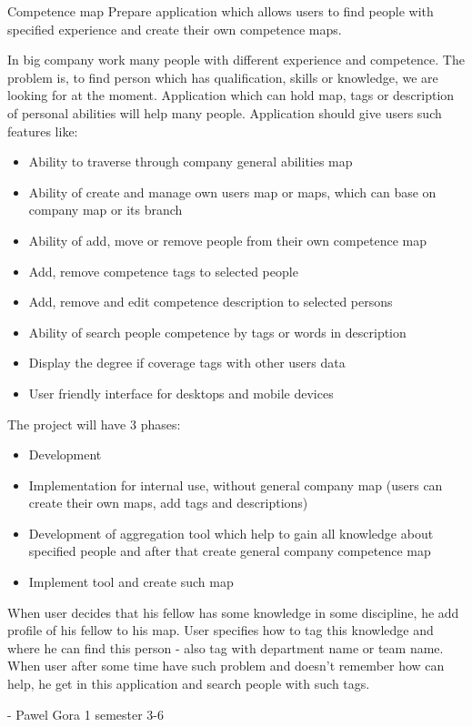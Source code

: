 \begin{project}
{Competence map}
{Prepare application which allows users to find people with specified experience and create their own competence maps.} 
{
In big company work many people with different experience and competence. The problem is, to find person which has qualification, skills or knowledge, we are looking for at the moment.
Application which can hold map, tags or description of personal abilities will help many people. 
Application should give users such features like:
\begin{itemize}
	\item Ability to traverse through company general abilities map
	\item Ability of create and manage own users map or maps, which can base on company map or its branch
	\item Ability of add, move or remove people from their own competence map
	\item Add, remove competence tags to selected people
	\item Add, remove and edit competence description to selected persons
	\item Ability of search people competence by tags or words in description
	\item Display  the degree if coverage tags with other users data 
	\item User friendly interface for desktops and mobile devices
\end{itemize}
The project will have 3 phases:
\begin{itemize}
	\item Development
	\item Implementation for internal use, without general company map (users can create their own maps, add tags and descriptions)
	\item Development of aggregation tool which help to gain all knowledge about specified people and after that create general company competence map
	\item Implement tool and create such map
\end{itemize}
When user decides that his fellow has some knowledge in some discipline, he add profile of his fellow to his map. User specifies how to tag this knowledge and where he can find this person - also tag with department name or team name.
When user after some time have such problem and doesn't remember how can help, he get in this application and search people with such tags.
}
{-}
{Pawel Gora}
{1 semester}
{3-6}
\end{project}
